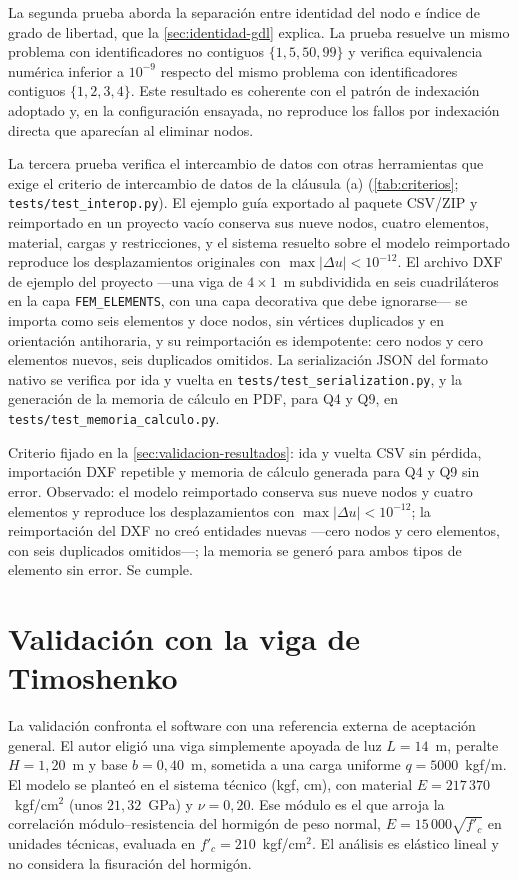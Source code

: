 La segunda prueba aborda la separación entre identidad del nodo e índice de grado de libertad, que la \autoref{sec:identidad-gdl} explica. La prueba resuelve un mismo problema con identificadores no contiguos $\{1,5,50,99\}$ y verifica equivalencia numérica inferior a $10^{-9}$ respecto del mismo problema con identificadores contiguos $\{1,2,3,4\}$. Este resultado es coherente con el patrón de indexación adoptado y, en la configuración ensayada, no reproduce los fallos por indexación directa que aparecían al eliminar nodos.

La tercera prueba verifica el intercambio de datos con otras herramientas que exige el criterio de intercambio de datos de la cláusula (a) (\autoref{tab:criterios}; \texttt{tests/test\_interop.py}). El ejemplo guía exportado al paquete CSV/ZIP y reimportado en un proyecto vacío conserva sus nueve nodos, cuatro elementos, material, cargas y restricciones, y el sistema resuelto sobre el modelo reimportado reproduce los desplazamientos originales con $\max|\Delta u| < 10^{-12}$. El archivo DXF de ejemplo del proyecto —una viga de $4\times1$~m subdividida en seis cuadriláteros en la capa \texttt{FEM\_ELEMENTS}, con una capa decorativa que debe ignorarse— se importa como seis elementos y doce nodos, sin vértices duplicados y en orientación antihoraria, y su reimportación es idempotente: cero nodos y cero elementos nuevos, seis duplicados omitidos. La serialización JSON del formato nativo se verifica por ida y vuelta en \texttt{tests/test\_serialization.py}, y la generación de la memoria de cálculo en PDF, para Q4 y Q9, en \texttt{tests/test\_memoria\_calculo.py}.

Criterio fijado en la \autoref{sec:validacion-resultados}: ida y vuelta CSV sin pérdida, importación DXF repetible y memoria de cálculo generada para Q4 y Q9 sin error. Observado: el modelo reimportado conserva sus nueve nodos y cuatro elementos y reproduce los desplazamientos con $\max|\Delta u| < 10^{-12}$; la reimportación del DXF no creó entidades nuevas —cero nodos y cero elementos, con seis duplicados omitidos—; la memoria se generó para ambos tipos de elemento sin error. Se cumple.

\section{Validación con la viga de Timoshenko}
\label{sec:timoshenko}

La validación confronta el software con una referencia externa de aceptación general. El autor eligió una viga simplemente apoyada de luz $L = 14$~m, peralte $H = 1{,}20$~m y base $b = 0{,}40$~m, sometida a una carga uniforme $q = 5000$~kgf/m. El modelo se planteó en el sistema técnico (kgf, cm), con material $E = 217\,370$~kgf/cm$^2$ (unos $21{,}32$~GPa) y $\nu = 0{,}20$. Ese módulo es el que arroja la correlación módulo--resistencia del hormigón de peso normal, $E = 15\,000\sqrt{f'_c}$ en unidades técnicas, evaluada en $f'_c = 210$~kgf/cm$^2$. El análisis es elástico lineal y no considera la fisuración del hormigón.

